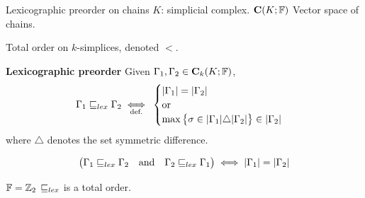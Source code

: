 %
%

%	
%	
%	
%	
%	
%	

\begin{frame}{Lexicographic preorder on chains}
	$K$: simplicial complex.
	$\mathbf{C}(K; \mathbb{F})$ Vector space of chains.
	
	Total order on $k$-simplices, denoted $<$.
		
	\textbf{Lexicographic preorder} Given $\Gamma_1, \Gamma_2 \in \mathbf{C}_k(K; \mathbb{F})$,
		\[
		\Gamma_1 \sqsubseteq_{lex} \Gamma_2 \underset{\text{def.}}{\iff} \:
		\begin{cases} 
			|\Gamma_1| = |\Gamma_2| \\
			\operatorname{or} \\
			\max \big\{ \sigma \in |\Gamma_1| \triangle |\Gamma_2|  \big\}  \in |\Gamma_2|
		\end{cases}
		\]
		where $\triangle$ denotes the set symmetric difference.
		
	\[
		\big( \Gamma_1 \sqsubseteq_{lex} \Gamma_2 \quad \textrm{and} \quad  	\Gamma_2 
		\sqsubseteq_{lex}  \Gamma_1 \big) \iff |\Gamma_1| = |\Gamma_2| 
	\]
	
	\begin{alertblock}{$\mathbb{F} = \mathbb{Z}_2$}
		$\sqsubseteq_{lex}$ is a total order.
	\end{alertblock}
\end{frame}

